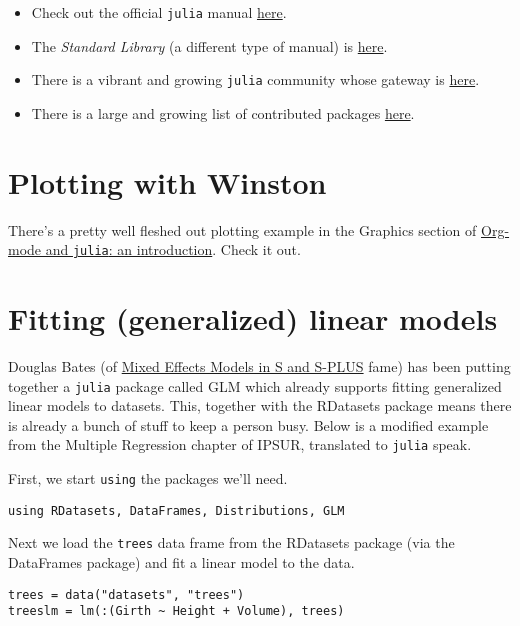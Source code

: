\documentclass[11pt]{article}
\begin{document}
\begin{itemize}
\item Check out the official \texttt{julia} manual \href{http://docs.julialang.org/en/latest/manual/}{here}.
\item The \emph{Standard Library} (a different type of manual) is \href{http://docs.julialang.org/en/latest/stdlib/}{here}.
\item There is a vibrant and growing \texttt{julia} community whose gateway is \href{http://julialang.org/community/}{here}.
\item There is a large and growing list of contributed packages \href{http://docs.julialang.org/en/latest/packages/packagelist/}{here}.
\end{itemize}
\section[Plotting with Winston]{Plotting with Winston}
\label{sec-4}

There's a pretty well fleshed out plotting example in the Graphics
section of \href{file://ob-julia-doc.org}{Org-mode and \texttt{julia}: an introduction}.  Check it out.
\section[Fitting (generalized) linear models]{Fitting (generalized) linear models}
\label{sec-5}

Douglas Bates (of \href{http://www.springer.com/statistics/statistical+theory+and+methods/book/978-1-4419-0317-4}{Mixed Effects Models in S and S-PLUS} fame) has been
putting together a \texttt{julia} package called GLM which already supports
fitting generalized linear models to datasets.  This, together with
the RDatasets package means there is already a bunch of stuff to keep
a person busy.  Below is a modified example from the Multiple
Regression chapter of IPSUR, translated to \texttt{julia} speak.

First, we start \texttt{using} the packages we'll need.

\begin{verbatim}
using RDatasets, DataFrames, Distributions, GLM
\end{verbatim}

Next we load the \texttt{trees} data frame from the RDatasets package (via
the DataFrames package) and fit a linear model to the data.

\begin{verbatim}
trees = data("datasets", "trees")
treeslm = lm(:(Girth ~ Height + Volume), trees)
\end{verbatim}
\end{document}
